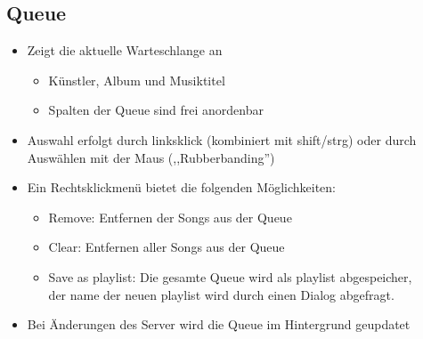 
\subsection{Queue}	
\begin{itemize}
    \item Zeigt die aktuelle Warteschlange an
        \begin{itemize}
            \item Künstler, Album und Musiktitel
            \item Spalten der Queue sind frei anordenbar
        \end{itemize}
    \item Auswahl erfolgt durch linksklick (kombiniert mit shift/strg) oder durch Auswählen mit der Maus (,,Rubberbanding'')
    \item Ein Rechtsklickmenü bietet die folgenden Möglichkeiten:
        \begin{itemize}
            \item Remove: Entfernen der Songs aus der Queue
            \item Clear: Entfernen aller Songs aus der Queue
            \item Save as playlist: Die gesamte Queue wird als playlist abgespeicher, \\
                  der name der neuen playlist wird durch einen Dialog abgefragt.
        \end{itemize}
    \item Bei Änderungen des Server wird die Queue im Hintergrund geupdatet
\end{itemize}


